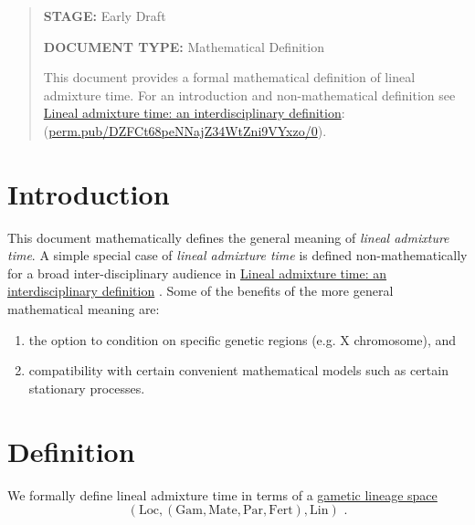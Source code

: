 \documentclass{article}
\begin{document}
\newcommand{\dom}[1]{\operatorname{dom}{ #1}}
\newcommand{\mathstop}{\text{ .}}

\newcommand{\Gam}{\mathrm{Gam}}
\newcommand{\Loc}{\mathrm{Loc}}
\newcommand{\Lin}{\mathrm{Lin}}
\newcommand{\Mate}{\mathrm{Mate}}
\newcommand{\Par}{\mathrm{Par}}
\newcommand{\Fert}{\mathrm{Fert}}
\newcommand{\Mrlt}{\mathrm{Mrlt}}


\begin{abstract}
\textbf{STAGE:} Early Draft

\textbf{DOCUMENT TYPE:} Mathematical Definition

This document provides a formal mathematical definition of lineal
admixture time. For an introduction and non-mathematical definition see
\href{https://perm.pub/DZFCt68peNNajZ34WtZni9VYxzo/0}{Lineal admixture time: an interdisciplinary definition}:
\\ (\href{https://perm.pub/DZFCt68peNNajZ34WtZni9VYxzo/0}{perm.pub/DZFCt68peNNajZ34WtZni9VYxzo/0}).
\end{abstract}

\section{Introduction}

This document mathematically defines the general meaning of \emph{lineal admixture time}.
A simple special case of \emph{lineal admixture time} is defined non-mathematically
for a broad inter-disciplinary audience in
\href{https://perm.pub/DZFCt68peNNajZ34WtZni9VYxzo/0}{Lineal admixture time: an interdisciplinary definition}
\cite{dsi:DZ/0}.
Some of the benefits of the more general mathematical meaning are:
\begin{enumerate}
\item the option to condition on specific genetic regions (e.g. X chromosome), and
\item compatibility with certain convenient mathematical models such as certain stationary
processes.
\end{enumerate}


\section{Definition}

We formally define lineal admixture time in terms of a
\href{https://popgen.es/0iV47kWzQAuyONrIDG538k3x3Qc/0.3/}{gametic
lineage space}
\cite{dsi:0i/0.3}
\[
(\Loc, (\Gam, \Mate, \Par, \Fert), \Lin)
\mathstop
\]
\end{document}

